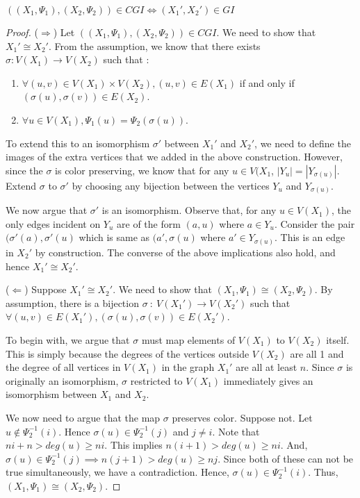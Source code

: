 \begin{claim}
$((X_1,\Psi_1),(X_2,\Psi_2))\in CGI \iff (X_1',X_2')\in GI$
\end{claim}
\begin{proof}
($\Longrightarrow$)
Let $((X_1,\Psi_1),(X_2,\Psi_2)) \in CGI$. We need to show that $X_1' \cong X_2'$. From the assumption, we know that there exists $\sigma : V(X_1) \rightarrow V(X_2)$ such that :
\begin{enumerate}
\item $\forall (u,v) \in V(X_1) \times V(X_2), (u,v) \in E(X_1)$ if and only if $(\sigma(u), \sigma(v)) \in E(X_2) $.
\item $\forall u \in V(X_1) , \Psi_1(u) = \Psi_2(\sigma(u))$.
\end{enumerate}
To extend this to an isomorphism $\sigma'$ between $X_1'$ and $X_2'$, we need to define the images of the extra vertices that we added in the above construction. However, since the $\sigma$ is color preserving, we know that for any $u \in V(X_1$, $|Y_u| = |Y_{\sigma(u)}|$. Extend $\sigma$ to $\sigma'$ by choosing any bijection between the vertices $Y_u$ and $Y_{\sigma(u)}$.

We now argue that $\sigma'$ is an isomorphism. Observe that, for any $u \in V(X_1)$, the only edges incident on $Y_u$ are of the form $(a,u)$ where $a \in Y_u$. Consider the pair $(\sigma'(a),\sigma'(u)$ which is same as $(a',\sigma(u)$ where $a' \in Y_{\sigma(u)}$. This is an edge in $X_2'$ by construction. The converse of the above implications also hold, and hence $X_1' \cong X_2'$.

\noindent ({$\Longleftarrow$})
Suppose $X_1' \cong X_2'$. We need to show that $(X_1,\Psi_1) \cong (X_2,\Psi_2)$. By assumption, there is a bijection $\sigma~:~V(X_1') \rightarrow V(X_2')$ such that $\forall (u,v) \in E(X_1'), (\sigma(u),\sigma(v)) \in E(X_2')$. 

To begin with, we argue that $\sigma$ must map elements of $V(X_1)$ to $V(X_2)$ itself. This is simply because the degrees of the vertices outside $V(X_2)$ are all 1 and the degree of all vertices in $V(X_1)$ in the graph $X_1'$ are all at least $n$. Since $\sigma$ is originally an isomorphism, $\sigma$ restricted to $V(X_1)$ immediately gives an isomorphism between $X_1$ and $X_2$.

We now need to argue that the map $\sigma$ preserves color. Suppose not. Let $u \notin \Psi_2^{-1}(i)$. Hence $\sigma(u) \in \Psi_2^{-1}(j)$ and $j \neq i$. Note that $ni + n > deg(u) \ge ni$. This implies $n(i+1) > deg(u) \ge ni$. And, $\sigma(u) \in \Psi_2^{-1}(j) \implies n(j+1) > deg(u) \ge nj$. Since both of these can not be true simultaneously, we have a contradiction. Hence, $\sigma(u) \in \Psi_2^{-1}(i)$. Thus, $(X_1,\Psi_1) \cong (X_2,\Psi_2)$.
\end{proof}


